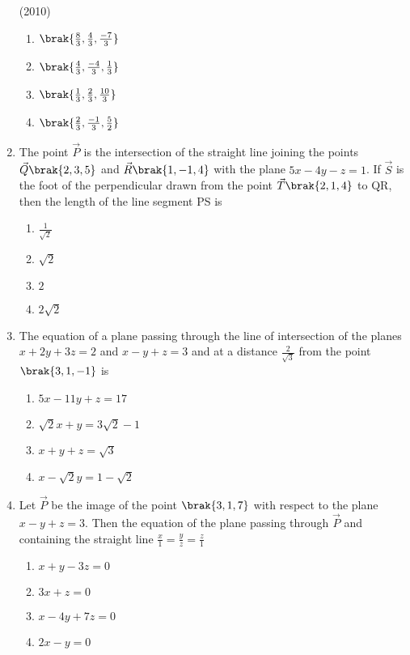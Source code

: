 \begin{enumerate}
    \hfill{(2010)}
    \begin{enumerate}
    	\item $\brak{\frac{8}{3}, \frac{4}{3}, \frac{-7}{3}}$
    	\item $\brak{\frac{4}{3}, \frac{-4}{3}, \frac{1}{3}}$
    	\item $\brak{\frac{1}{3}, \frac{2}{3}, \frac{10}{3}}$
    	\item $\brak{\frac{2}{3}, \frac{-1}{3}, \frac{5}{2}}$
    \end{enumerate}
	 \item %
		 The point $\vec{P}$ is the intersection of the straight line joining the points $\vec{Q}\brak{2,3,5}$ and $\vec{R}\brak{1,-1,4}$ with the plane $5x-4y-z=1$. If $\vec{S}$ is the foot of the perpendicular drawn from the point $\vec{T}\brak{2,1,4}$ to QR, then the length of the line segment PS is \hfill{}\\
\begin{enumerate}
	\item $\frac{1}{\sqrt{2}}$           
	\item $\sqrt{2}$                   
        \item $2$           
	\item $2\sqrt{2}$\\ 
\end{enumerate}
         \item %
		 The equation of a plane passing through the line of intersection of the planes $x+2y+3z=2$ and $x-y+z=3$ and at a distance $\frac{2}{\sqrt{3}}$ from the point $\brak{3,1,-1}$ is \hfill{}\\
\begin{enumerate}
        \item $5x-11y+z=17$           
	\item $\sqrt{2}x+y=3\sqrt{2}-1$                   
	\item $x+y+z=\sqrt{3}$           
	\item $x-\sqrt{2}y=1-\sqrt{2}$\\ 
\end{enumerate}
         \item %
		 Let $\vec{P}$ be the image of the point $\brak{3,1,7}$ with respect to the plane $x-y+z=3$. Then the equation of the plane passing through $\vec{P}$ and containing the straight line $\frac{x}{1}=\frac{y}{z}=\frac{z}{1}$ \hfill{}\\
\begin{enumerate}
        \item $x+y-3z=0$                             
        \item $3x+z=0$                           
        \item $x-4y+7z=0$            
        \item $2x-y=0$\\          
\end{enumerate}


\end{enumerate}
